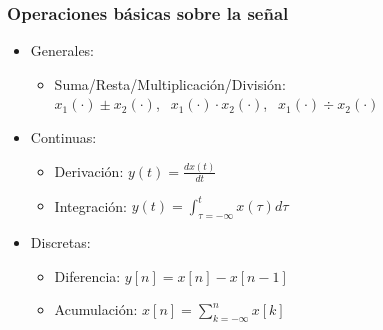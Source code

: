 \begin{frame}
  \frametitle{Operaciones básicas sobre la señal}
  \begin{itemize}
    \item \color{red}Generales\color{black}:
    \begin{itemize}
      \vspace{0.1cm}
      \item  {Suma/Resta/Multiplicación/División}:\\
      \vspace{0.1cm}
      \color{blue}$x_1(\cdot) \pm x_2(\cdot)$,   $\:\:x_1(\cdot) \cdot x_2(\cdot)$,  $\:\:x_1(\cdot) \div x_2(\cdot)$\color{black}
    \end{itemize}
    \vspace{0.1cm}
    \item{\color{red}Continuas\color{black}}:
    \begin{itemize}
      \vspace{0.1cm}
      \item Derivación: \color{blue}$y(t)=\frac{dx(t)}{dt}$\color{black}
      \vspace{0.2cm}
      \item Integración: \color{blue}$y(t)=\int_{\tau=-\infty}^t x(\tau) d\tau$\color{black}
      \vspace{0.1cm}
    \end{itemize}
    \item{\color{red}Discretas\color{black}}:
    \begin{itemize}
      \vspace{0.1cm}
      \item Diferencia: \color{blue}$y[n]=x[n]-x[n-1]$\color{black}
      \vspace{0.2cm}
      \item Acumulación: \color{blue}$x[n]=\sum_{k=-\infty}^n x[k]$\color{blue}
      \vspace{0.1cm}
    \end{itemize}
  \end{itemize}
\end{frame}


